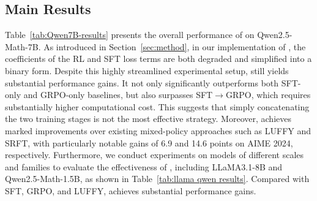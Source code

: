 \subsection{Main Results}

Table~\ref{tab:Qwen7B-results} presents the overall performance of \mot on Qwen2.5-Math-7B.
As introduced in Section~\ref{sec:method}, in our implementation of \mot, the coefficients of the RL and SFT loss terms are both degraded and simplified into a binary form.
Despite this highly streamlined experimental setup, \mot still yields substantial performance gains.
It not only significantly outperforms both SFT-only and GRPO-only baselines, but also surpasses SFT$\rightarrow$GRPO, which requires substantially higher computational cost.
This suggests that simply concatenating the two training stages is not the most effective strategy.
Moreover, \mot achieves marked improvements over existing mixed-policy approaches such as LUFFY and SRFT, with particularly notable gains of 6.9 and 14.6 points on AIME 2024, respectively.
Furthermore, we conduct experiments on models of different scales and families to evaluate the effectiveness of \mot, including LLaMA3.1-8B and Qwen2.5-Math-1.5B, as shown in Table~\ref{tab:llama qwen results}.
Compared with SFT, GRPO, and LUFFY, \mot achieves substantial performance gains.











